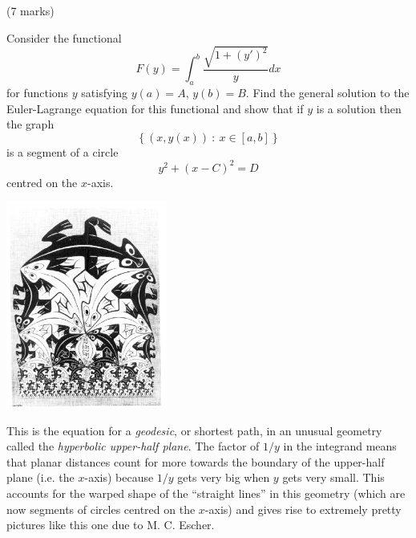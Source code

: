 \documentclass[12pt]{article}
\begin{document}
\newpage
\fi

\bigskip

\begin{question}(7 marks)\\
\begin{multicols}{2}
Consider the functional
\[F(y)=\int_a^b\frac{\sqrt{1+(y')^2}}{y}dx\]
for functions $y$ satisfying $y(a)=A$, $y(b)=B$. Find the general solution to the Euler-Lagrange equation for this functional and show that if $y$ is a solution then the graph
\[\left\{(x,y(x))\ :\ x\in[a,b]\right\}\]
is a segment of a circle
\[y^2+(x-C)^2=D\]
centred on the $x$-axis.

\begin{center}
\includegraphics[width=150pt]{lizards.jpg}
\end{center}
\end{multicols}

\begin{rmk}
This is the equation for a {\em geodesic}, or shortest path, in an unusual geometry called the {\em hyperbolic upper-half plane}. The factor of $1/y$ in the integrand means that planar distances count for more towards the boundary of the upper-half plane (i.e. the $x$-axis) because $1/y$ gets very big when $y$ gets very small. This accounts for the warped shape of the ``straight lines'' in this geometry (which are now segments of circles centred on the $x$-axis) and gives rise to extremely pretty pictures like this one due to M. C. Escher.
\end{rmk}

\end{question}
\end{document}
